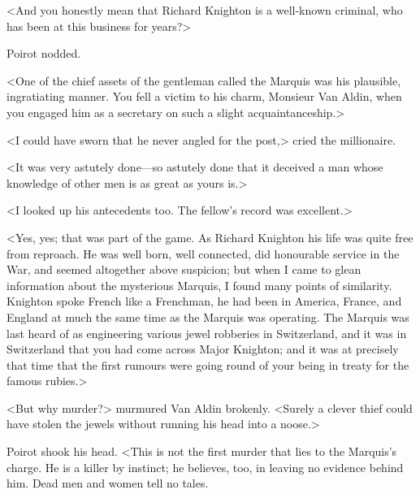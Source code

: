 <And you honestly mean that Richard Knighton is a well-known criminal, who has been at this business for years?>

Poirot nodded.

<One of the chief assets of the gentleman called the Marquis was his plausible, ingratiating manner. You fell a victim to his charm, Monsieur Van Aldin, when you engaged him as a secretary on such a slight acquaintanceship.>

<I could have sworn that he never angled for the post,> cried the millionaire.

<It was very astutely done—so astutely done that it deceived a man whose knowledge of other men is as great as yours is.>

<I looked up his antecedents too. The fellow's record was excellent.>

<Yes, yes; that was part of the game. As Richard Knighton his life was quite free from reproach. He was well born, well connected, did honourable service in the War, and seemed altogether above suspicion; but when I came to glean information about the mysterious Marquis, I found many points of similarity. Knighton spoke French like a Frenchman, he had been in America, France, and England at much the same time as the Marquis was operating. The Marquis was last heard of as engineering various jewel robberies in Switzerland, and it was in Switzerland that you had come across Major Knighton; and it was at precisely that time that the first rumours were going round of your being in treaty for the famous rubies.>

<But why murder?> murmured Van Aldin brokenly. <Surely a clever thief could have stolen the jewels without running his head into a noose.>

Poirot shook his head. <This is not the first murder that lies to the Marquis's charge. He is a killer by instinct; he believes, too, in leaving no evidence behind him. Dead men and women tell no tales.

